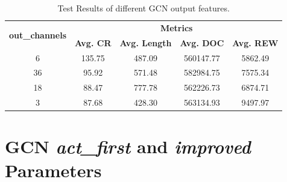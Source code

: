 \begin{table}[H]
	\centering
	\caption{Test Results of different \ac{GCN} output features.}
	\begin{tabular}{ccccc}
		\toprule
		\multirow{2}{*}{\textbf{out\_channels}} & \multicolumn{4}{c}{\textbf{Metrics}} \\ 
		\cmidrule(lr){2-5}
		&  \textbf{Avg. CR} & \textbf{Avg. Length} & \textbf{Avg. DOC} & \textbf{Avg. REW} \\ 
		\midrule
		6 & 135.75 & 487.09 & 560147.77 & 5862.49 \\
		36 & 95.92 & 571.48 & 582984.75 & 7575.34 \\
		18 & 88.47 & 777.78 & 562226.73 & 6874.71 \\
		3 & 87.68 & 428.30 & 563134.93 & 9497.97 \\
		\bottomrule
	\end{tabular}
	\label{tab:test-gcn-out2}
\end{table}

\section{\ac{GCN} \textit{act\_first} and \textit{improved} Parameters}

